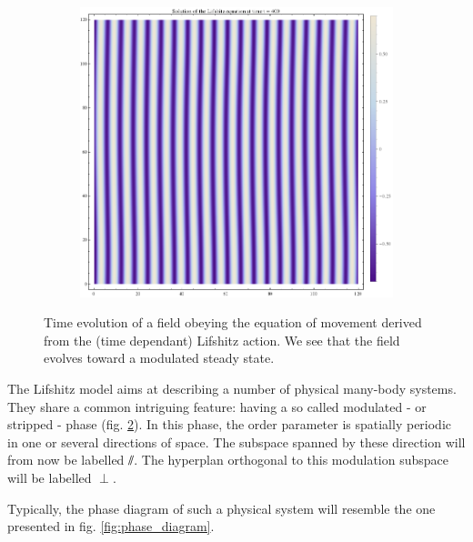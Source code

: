 \begin{figure}[htp]
\begin{subfigure}{.33\textwidth}
	\centering
	\includegraphics[width=.9\linewidth]{img/chap1/sol_Lif_t400.png}
	\caption{}
	\label{lif_t400}
\end{subfigure}
\caption{Time evolution of a field obeying the equation of movement derived from the (time dependant) Lifshitz action. We see that the field evolves toward a modulated steady state.}
\label{fig:evol_strip}
\end{figure}

The Lifshitz model aims at describing a number of physical many-body systems. They share a common intriguing feature: having a so called modulated - or stripped - phase (fig. \ref{fig:evol_strip}). In this phase, the order parameter is spatially periodic in one or several directions of space. The subspace spanned by these direction will from now be labelled $\sslash$. The hyperplan orthogonal to this modulation subspace will be labelled $\perp$.

Typically, the phase diagram of such a physical system will resemble the one presented in fig. \ref{fig:phase_diagram}.

